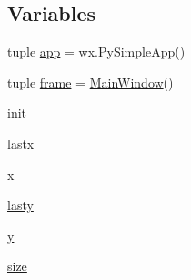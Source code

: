 \subsection*{Variables}
\begin{DoxyCompactItemize}
\item 
tuple \hyperlink{namespacearbitros_ahrs_a81b00751d7a27e4de7d93606d1cad0a9}{app} = wx.\-Py\-Simple\-App()
\item 
tuple \hyperlink{namespacearbitros_ahrs_a2c50802abc7148d2d35f784a1f0b28ac}{frame} = \hyperlink{classarbitros_ahrs_1_1_main_window}{Main\-Window}()
\item 
\hyperlink{namespacearbitros_ahrs_a978c1602c1c480e86c09f3c3a1b8cc98}{init}
\item 
\hyperlink{namespacearbitros_ahrs_aeca1f9f28ebd827edcf82b2f5c62d0fc}{lastx}
\item 
\hyperlink{namespacearbitros_ahrs_a9336ebf25087d91c818ee6e9ec29f8c1}{x}
\item 
\hyperlink{namespacearbitros_ahrs_ab2e7ee3b161d51a5f944b068e105346c}{lasty}
\item 
\hyperlink{namespacearbitros_ahrs_a2fb1c5cf58867b5bbc9a1b145a86f3a0}{y}
\item 
\hyperlink{namespacearbitros_ahrs_aa3d6656320f1a7278c0c2c7fdf07617c}{size}
\end{DoxyCompactItemize}


